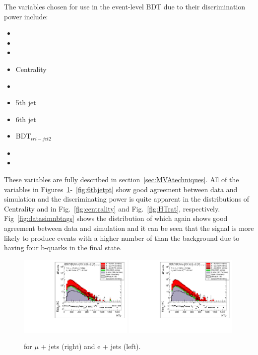 The variables chosen for use in the event-level BDT due to their discrimination power include:
\begin{multicols}{2}
\begin{itemize}
\item \njets
\item \nMtags
\item \HTb
\item Centrality
\item \HTrat
\item 5th jet \pt
\item 6th jet \pt
\item BDT$_{tri-jet2}$
\item \sumjetmassX
\item \HTX
\end{itemize}
\end{multicols}
These variables are fully described in section~\ref{sec:MVAtechniques}. All of the variables in Figures~\ref{fig:HTb}-~\ref{fig:6thjetpt} show good agreement between data and simulation and the discriminating power is quite apparent in the distributions of Centrality and \HTrat in Fig.~\ref{fig:centrality} and Fig.~\ref{fig:HTrat}, respectively. Fig~\ref{fig:datasimnbtags} shows the distribution of \nMtags which again shows good agreement between data and simulation and it can be seen that the \tttt signal is more likely to produce events with a higher number of \nMtags than the background due to having four b-quarks in the final state.


\begin{figure}[!ht]
    \includegraphics[clip, trim=0.15cm 0.15cm 0.15cm 0.1cm, width=0.49\textwidth]{images/Run1/HTb_SelectedJets_StackLogY_Mu.pdf}
    \includegraphics[clip, trim=0.15cm 0.15cm 0.15cm 0.1cm, width=0.49\textwidth]{images/Run1/HTb_SelectedJets_StackLogY_e.pdf}
    \caption{\HTb for $\mu$ + jets (right) and e + jets (left).}
    \label{fig:HTb}
\end{figure}

